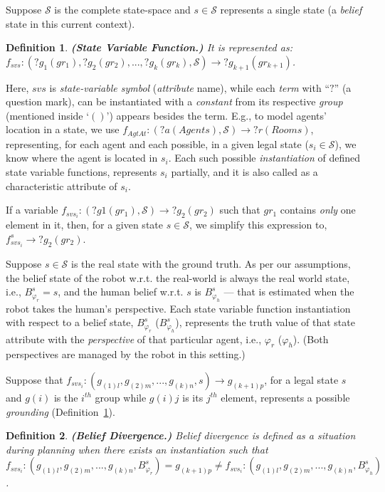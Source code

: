 \documentclass[letterpaper]{article} %
\newtheorem{definition}{Definition}
\begin{document}
Suppose $\mathcal{S}$ is the complete state-space and $s \in \mathcal{S}$ represents a single state (a \textit{belief} state in this current context).  

\begin{definition}\label{def:svf}
\textbf{(State Variable Function.)} It is represented as: $f_{svs}:(?g_1 (gr_1), ?g_2 (gr_2), ..., ?g_k (gr_k),\mathcal{S})\rightarrow ?g_{k+1} (gr_{k+1})$. 
\end{definition}
Here, $svs$ is \textit{state-variable symbol} (\textit{attribute} name), while each \textit{term} with ``$?$'' (a question mark), can be instantiated with a \textit{constant} from its respective \textit{group} (mentioned inside `$()$') appears besides the term. 
E.g., to model agents' location in a state, we use $f_{\textit{AgtAt}}:(?a (Agents), \mathcal{S}) \rightarrow ?r (Rooms)$, representing, for each agent and each possible, in a given legal state ($s_i \in \mathcal{S}$), we know where the agent is located in $s_i$. 
Each such possible \textit{instantiation} of defined state variable functions, represents $s_i$ partially, and it is also called as a characteristic attribute of $s_i$.     

If a variable $f_{svs_i}: (?g1 (gr_1), \mathcal{S}) \rightarrow ?g_2 (gr_2)$ such that $gr_1$ contains \textit{only} one element in it, then, for a given state $s \in \mathcal{S}$, we simplify this expression to, $f_{svs_i}^{s} \rightarrow ?g_2 (gr_2)$. 

Suppose $s \in \mathcal{S}$ is the real state with the ground truth. As per our assumptions, the belief state of the robot w.r.t. the real-world is always the real world state, i.e., $B_{\varphi_r}^s = s$, and the human belief w.r.t. $s$ is $B_{\varphi_h}^s$ --- that is estimated when the robot takes the human's perspective. Each state variable function instantiation with respect to a belief state, $B_{\varphi_r}^s$ ($B_{\varphi_h}^s$), represents the truth value of that state attribute with the \textit{perspective} of that particular agent, i.e., $\varphi_r$ ($\varphi_h$). (Both perspectives are managed by the robot in this setting.) 

Suppose that $f_{\textit{svs}_i}:(g_{(1)l},g_{(2)m},...,g_{(k)n},s) \rightarrow g_{(k+1)p}$, for a legal state $s$ and $g(i)$ is the $i^{th}$ group while $g(i)j$ is its $j^{th}$ element, represents a possible {\em grounding} (Definition~\ref{def:svf}).

\begin{definition} \label{def:bd}
\textbf{(Belief Divergence.)}
Belief divergence is defined as a situation during planning when there exists an instantiation such that $f_{\textit{svs}_i}:(g_{(1)l},g_{(2)m},...,g_{(k)n},B_{\varphi_r}^s) = {g_{(k+1)p}}  \neq f_{\textit{svs}_i}:(g_{(1)l},g_{(2)m},...,g_{(k)n},B_{\varphi_h}^s)$.
\end{definition} 
\end{document}
